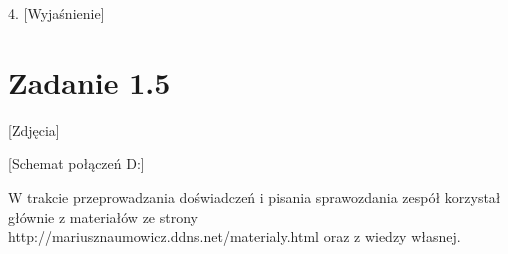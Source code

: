 \documentclass[polish,a4paper]{article}
\begin{document}
4. [Wyjaśnienie]

\section{Zadanie 1.5}
[Zdjęcia]
\newline

[Schemat połączeń D:]




\begin{thebibliography}{9}

  W trakcie przeprowadzania doświadczeń i pisania sprawozdania zespół korzystał głównie z materiałów ze strony http://mariusznaumowicz.ddns.net/materialy.html oraz z wiedzy własnej.

\end{thebibliography}
\end{document}
